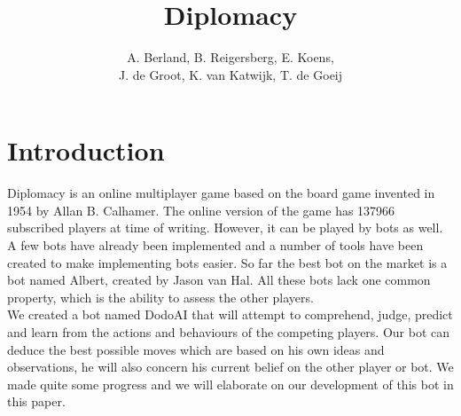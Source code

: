 \documentclass[a4paper]{article} %
\title{Diplomacy}
\author{A. Berland, B. Reigersberg, E. Koens, \\J. de Groot, K. van Katwijk, T. de Goeij}
\begin{document}
\maketitle
\tableofcontents
\newpage

\section{Introduction}
Diplomacy is an online multiplayer game based on the board game invented in 1954 by Allan B. Calhamer. The online version of the game has 137966 subscribed players at time of writing. However, it can be played by bots as well. A few bots have already been implemented and a number of tools have been created to make implementing bots easier. So far the best bot on the market is a bot named Albert, created by Jason van Hal. All these bots lack one common property, which is the ability to assess the other players. 
\\We created a bot named DodoAI that will attempt to comprehend, judge, predict and learn from the actions and behaviours of the competing players. Our bot can deduce the best possible moves which are based on his own ideas and observations, he will also concern his current belief on the other player or bot. We made quite some progress and we will elaborate on our development of this bot in this paper.
\end{document}
